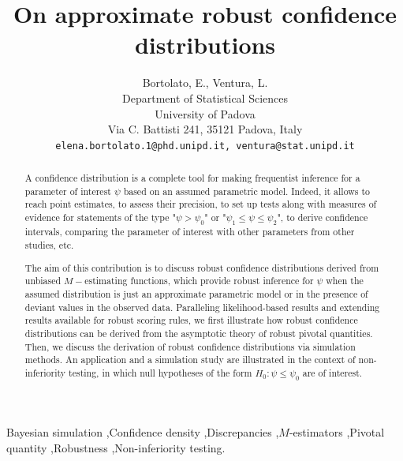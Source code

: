 \documentclass[preprint,12pt,authoryear]{elsarticle}
\begin{document}
\begin{frontmatter}

 
\title{On approximate robust confidence distributions}

\author{Bortolato, E., Ventura, L. \\[0.5cm]
{\footnotesize Department of Statistical Sciences \\ University of Padova \\
Via C. Battisti 241, 35121 Padova, Italy} \\
{\footnotesize {\tt elena.bortolato.1@phd.unipd.it, ventura@stat.unipd.it}}}

            

\begin{abstract}
A confidence distribution is a complete tool for making frequentist inference for a parameter  of interest $\psi$ based on an assumed parametric model. Indeed, it allows to reach point estimates, to assess their precision, to set up tests along with measures of evidence for statements of the type "$\psi > \psi_0$" or "$\psi_1 \leq \psi \leq \psi_2$", to derive confidence intervals, comparing the parameter of interest with other parameters from other studies, etc.  

The aim of this contribution is to discuss robust confidence distributions derived from unbiased $M-$estimating functions, which provide robust inference for $\psi$  when the assumed distribution is just an approximate parametric model or in the presence of deviant values in the observed data.
Paralleling likelihood-based results and extending results available for robust scoring rules, we first  illustrate how robust confidence distributions can be derived from the asymptotic theory of robust pivotal quantities. Then, we discuss the derivation of robust confidence distributions via simulation methods. An application and a simulation study are illustrated in the context of non-inferiority testing, in which null hypotheses of the form $H_0: \psi \leq \psi_0$ are of interest.
 \end{abstract}

\begin{keyword}
Bayesian simulation \sep Confidence density  \sep Discrepancies \sep $M$-estimators \sep Pivotal quantity \sep Robustness  \sep Non-inferiority testing.
\end{keyword}

\end{frontmatter}
\end{document}
